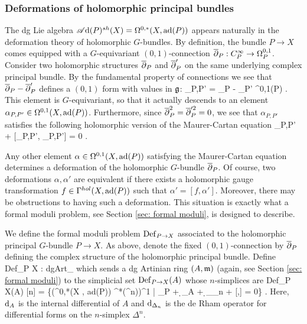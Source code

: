 \documentclass[10pt]{amsart}
\def\sAd{\sA{\rm d}}
\begin{document}
\subsubsection{Deformations of holomorphic principal bundles}

The dg Lie algebra $\sAd(P)^{sh}(X) = \Omega^{0,*}(X, \ad(P))$ appears naturally in the deformation theory of holomorphic $G$-bundles. 
By definition, the bundle $P \to X$ comes equipped with a $G$-equivariant $(0,1)$-connection $\overline{\partial}_P : C^\infty_P \to \Omega^{0,1}_P$. 
Consider two holomorphic structures $\overline{\partial}_P$ and $\overline{\partial}_P'$ on the same underlying complex principal bundle. 
By the fundamental property of connections we see that $\overline{\partial}_P - \overline{\partial}_P'$ defines a $(0,1)$ form with values in $\mathfrak g$:
\ben
\alpha_{P,P'} = \dbar_P - \dbar_P' \in \Omega^{0,1}(P) \tensor \fg .
\een
This element is $G$-equivariant, so that it actually descends to an element $\alpha_{P,P'} \in \Omega^{0,1}(X, {\rm ad}(P))$. 
Furthermore, since $\overline{\partial}_P^2 = \overline{\partial}_P'^2 = 0$, we see that $\alpha_{P,P'}$ satisfies the following holomorphic version of the Maurer-Cartan equation
\ben
\dbar \alpha_{P,P'} +  [\alpha_{P,P'}, \alpha_{P,P'}] = 0 .
\een

Any other element $\alpha \in \Omega^{0,1}(X, {\rm ad}(P))$ satisfying the Maurer-Cartan equation determines a deformation of the holomorphic $G$-bundle $\overline{\partial}_P$.
Of course, two deformations $\alpha,\alpha'$ are equivalent if there exists a holomorphic gauge transformation $f \in \Gamma^{hol}(X, {\rm ad}(P))$ such that $\alpha' = [f, \alpha']$. 
Moreover, there may be obstructions to having such a deformation. 
This situation is exactly what a formal moduli problem, see Section \ref{sec: formal moduli}, is designed to describe.

We define the formal moduli problem ${\rm Def}_{P\to X}$ associated to the holomorphic principal $G$-bundle $P \to X$. 
As above, denote the fixed $(0,1)$-connection by $\overline{\partial}_P$ defining the complex structure of the holomorphic principal bundle. 
Define
\ben
{\rm Def}_{P \to X} : {\rm dgArt}_\CC {}
\een
which sends a dg Artinian ring $(A, {\mathfrak m})$ (again, see Section \ref{sec: formal moduli}) to the simplicial set ${\rm Def}_{P \to X}(A)$ whose $n$-simplices are
\ben
{\rm Def}_{P \to X}(A) [n] = \left\{\alpha \in \left(\Omega^{0,*}(X , {\rm ad}(P)) \tensor \fm \tensor \Omega^*(\Delta^n)\right)^1  \;  | \; \dbar_P \alpha + \d_A \alpha + \d_{\Delta_n} \alpha +  [\alpha,\alpha] = 0\right\} .
\een
Here, ${\rm d}_A$ is the internal differential of $A$ and ${\rm d}_{\Delta_n}$ is the de Rham operator for differential forms on the $n$-simplex $\Delta^n$. 
\end{document}
